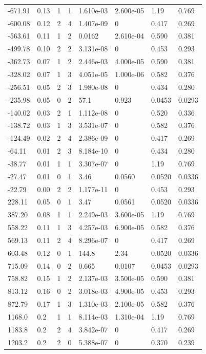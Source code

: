 \documentclass[preview]{standalone}
\begin{document}
{{\begin{tabular}{L{1.2cm}C{1.2cm} C{0.3cm}C{0.5cm} C{1.4cm}C{1.4cm} C{1.4cm}C{1.4cm}}
  -671.91  &  0.13  & 1     &  1 &  1.610e-03  & 2.600e-05  & 1.19 &  0.769   \\ 
  -600.08  &  0.12  & 2     &  4 &  1.407e-09  & 0  & 0.417 &  0.269   \\ 
  -563.61  &  0.11  & 1     &  2 &  0.0162  & 2.610e-04  & 0.590 &  0.381   \\ 
  -499.78  &  0.10  & 2     &  2 &  3.131e-08  & 0  & 0.453 &  0.293   \\ 
  -362.73  &  0.07  & 1     &  2 &  2.446e-03  & 4.000e-05  & 0.590 &  0.381   \\ 
  -328.02  &  0.07  & 1     &  3 &  4.051e-05  & 1.000e-06  & 0.582 &  0.376   \\ 
  -256.51  &  0.05  & 2     &  3 &  1.980e-08  & 0  & 0.434 &  0.280   \\ 
  -235.98  &  0.05  & 0     &  2 &  57.1  & 0.923  & 0.0453 &  0.0293   \\ 
  -140.02  &  0.03  & 2     &  1 &  1.112e-08  & 0  & 0.520 &  0.336   \\ 
  -138.72  &  0.03  & 1     &  3 &  3.531e-07  & 0  & 0.582 &  0.376   \\ 
  -124.49  &  0.02  & 2     &  4 &  2.386e-09  & 0  & 0.417 &  0.269   \\ 
  -64.11  &  0.01  & 2     &  3 &  8.184e-10  & 0  & 0.434 &  0.280   \\ 
  -38.77  &  0.01  & 1     &  1 &  3.307e-07  & 0  & 1.19 &  0.769   \\ 
  -27.47  &  0.01  & 0     &  1 &  3.46  & 0.0560  & 0.0520 &  0.0336   \\ 
  -22.79  &  0.00  & 2     &  2 &  1.177e-11  & 0  & 0.453 &  0.293   \\ 
  228.11  &  0.05  & 0     &  1 &  3.47  & 0.0561  & 0.0520 &  0.0336   \\ 
  387.20  &  0.08  & 1     &  1 &  2.249e-03  & 3.600e-05  & 1.19 &  0.769   \\ 
  558.22  &  0.11  & 1     &  3 &  4.257e-03  & 6.900e-05  & 0.582 &  0.376   \\ 
  569.13  &  0.11  & 2     &  4 &  8.296e-07  & 0  & 0.417 &  0.269   \\ 
  603.48  &  0.12  & 0     &  1 &  144.8  & 2.34  & 0.0520 &  0.0336   \\ 
  715.09  &  0.14  & 0     &  2 &  0.665  & 0.0107  & 0.0453 &  0.0293   \\ 
  758.82  &  0.15  & 1     &  2 &  2.137e-03  & 3.500e-05  & 0.590 &  0.381   \\ 
  813.12  &  0.16  & 0     &  2 &  3.018e-03  & 4.900e-05  & 0.453 &  0.293   \\ 
  872.79  &  0.17  & 1     &  3 &  1.310e-03  & 2.100e-05  & 0.582 &  0.376   \\ 
  1168.0  &   0.2  & 1     &  1 &  8.114e-03  & 1.310e-04  & 1.19 &  0.769   \\ 
  1183.8  &   0.2  & 2     &  4 &  3.842e-07  & 0  & 0.417 &  0.269   \\ 
  1203.2  &   0.2  & 2     &  0 &  5.388e-07  & 0  & 0.370 &  0.239   \\ 
\hline 
\end{tabular} 

}}
\end{document}
